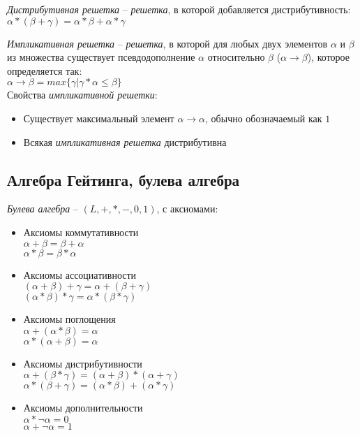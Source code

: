 \emph{Дистрибутивная решетка} -- \emph{решетка}, в которой добавляется дистрибутивность:\\
$\alpha * (\beta + \gamma) = \alpha * \beta + \alpha * \gamma$

\emph{Импликативная решетка} -- \emph{решетка}, в которой для любых двух элементов $\alpha$ и $\beta$ из множества существует псевдодополнение $\alpha$ относительно $\beta$ ($\alpha \rightarrow \beta$), которое определяется так:\\
$\alpha \rightarrow \beta = max \lbrace \gamma \vert \gamma * \alpha \leq \beta \rbrace$\\
Свойства \emph{импликативной решетки}:
\begin{itemize}
\item Существует максимальный элемент $\alpha \rightarrow \alpha$, обычно обозначаемый как $1$
\item Всякая \emph{импликативная решетка} дистрибутивна
\end{itemize}

\subsection{Алгебра Гейтинга, булева алгебра}
\label{sec-5-4}
\emph{Булева алгебра} -- $(L, +, *, -, 0, 1)$, с аксиомами:
\begin{itemize}
\item Аксиомы коммутативности\\
$\alpha + \beta = \beta + \alpha$\\
$\alpha * \beta = \beta * \alpha$
\item Аксиомы ассоциативности\\
$(\alpha + \beta) + \gamma = \alpha + (\beta + \gamma)$\\
$(\alpha * \beta) * \gamma = \alpha * (\beta * \gamma)$
\item Аксиомы поглощения\\
$\alpha + (\alpha * \beta) = \alpha$\\
$\alpha * (\alpha + \beta) = \alpha$
\item Аксиомы дистрибутивности\\
$\alpha + (\beta * \gamma) = (\alpha + \beta) * (\alpha + \gamma)$\\
$\alpha * (\beta + \gamma) = (\alpha * \beta) + (\alpha * \gamma)$
\item Аксиомы дополнительности\\
$\alpha * \neg \alpha = 0$\\
$\alpha + \neg \alpha = 1$
\end{itemize}

